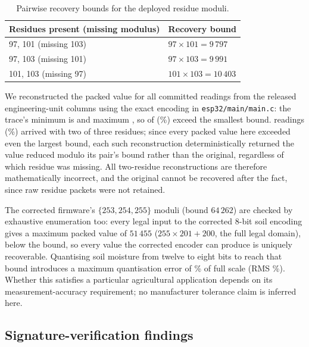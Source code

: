 \documentclass[a4paper,fleqn]{cas-sc}
\begin{document}
\begin{table}[t]
\caption{Pairwise recovery bounds for the deployed residue moduli.}
\label{tab:crtpairs}
\small
\begin{tabularx}{\columnwidth}{@{}lX@{}}
\toprule
Residues present (missing modulus) & Recovery bound \\
\midrule
97, 101 (missing 103) & $97\times 101 = 9\,797$ \\
97, 103 (missing 101) & $97\times 103 = 9\,991$ \\
101, 103 (missing 97) & $101\times 103 = 10\,403$ \\
\bottomrule
\end{tabularx}
\end{table} We reconstructed the packed
value for all \CRTExceedN{} committed readings from the released
engineering-unit columns using the exact encoding in
\texttt{esp32/main/main.c}: the trace's minimum is \CRTPackedMin{} and
maximum \CRTPackedMax{}, so \CRTExceedCount{} of \CRTExceedN{}
(\CRTExceedPct\%) exceed the smallest bound. \CRTRecovered{} readings
(\CRTLossRatePct\%) arrived with two of three residues; since every
packed value here exceeded even the largest bound, each such
reconstruction deterministically returned the value reduced modulo its
pair's bound rather than the original, regardless of which residue was
missing. All \CRTRecovered{} two-residue reconstructions are therefore
mathematically incorrect, and the original cannot be recovered after the
fact, since raw residue packets were not retained.

The corrected firmware's $\{253, 254, 255\}$ moduli (bound $64\,262$) are
checked by exhaustive enumeration too: every legal input to the corrected
8-bit soil encoding gives a maximum packed value of $51\,455$
($255 \times 201 + 200$, the full legal domain), below the bound, so
every value the corrected encoder can produce is uniquely recoverable.
Quantising soil moisture from twelve to eight bits to reach that bound
introduces a maximum quantisation error of \QuantErrMaxPct\% of full
scale (RMS \QuantErrRMSPct\%). Whether this satisfies a particular
agricultural application depends on its measurement-accuracy requirement;
no manufacturer tolerance claim is inferred here.

\subsection{Signature-verification findings}
\label{subsec:pm_signature}
\end{document}
